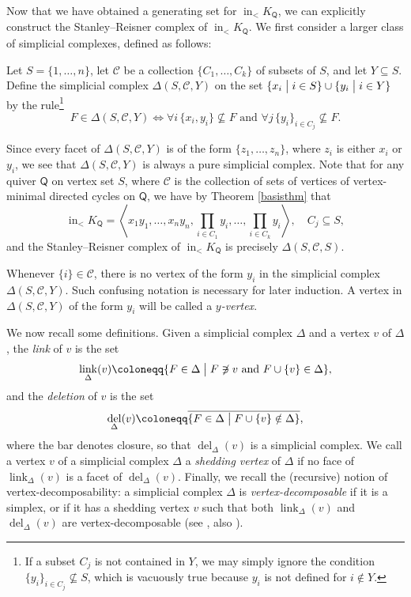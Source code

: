 \documentclass[ALCO,published]{cedram}
\numberwithin{equation}{section}
\newcommand{\st}{\bigm\vert}
\newcommand{\sC}{\mathscr{C}}
\DeclareMathOperator{\del}{\mathrm{del}}
\DeclareMathOperator{\In}{\mathrm{in}}
\DeclareMathOperator{\link}{\mathrm{link}}
\newcommand{\1}{^{-1}}
\newcommand{\la}{\langle}
\newcommand{\ra}{\rangle}
\def\Q{\mathsf{Q}}
\begin{document}
\noindent
Now that we have obtained a generating set for $\In_< K_{\Q}$, we can explicitly construct the Stanley--Reisner complex of $\In_< K_{\Q}$. We first consider a larger class of simplicial complexes, defined as follows:
\begin{defn}
Let $S = \{1,\dots,n\}$, let $\sC$ be a collection $\{C_1,\dots,C_k\}$ of subsets of $S$, and let $Y \subseteq S$.  Define the simplicial complex $\Delta(S,\sC,Y)$ on the set $\{x_i \st i \in S\} \cup \{y_i \st i \in Y\}$ by the rule\footnote{If a subset $C_j$ is not contained in $Y$, we may simply ignore the condition $\{y_i\}_{i\in C_j} \not\subseteq S$, which is vacuously true because $y_i$ is not defined for $i\not\in Y$.}
\[
F \in \Delta(S,\sC,Y) \iff \forall i \, \{x_i,y_i\} \not \subseteq F \text{ and } \forall j \, \{y_i\}_{i \in C_j} \not \subseteq F.
\]
\end{defn}
Since every facet of $\Delta(S,\sC,Y)$ is of the form $\{z_1,\dots,z_n\}$, where $z_i$ is either $x_i$ or $y_i$, we see that $\Delta(S,\sC,Y)$ is always a pure simplicial complex. Note that for any quiver $\Q$ on vertex set $S$, where $\sC$ is the collection of sets of vertices of vertex-minimal directed cycles on $\Q$, we have by Theorem \ref{basisthm} that
\begin{equation}\label{idealform}
\In_< K_{\mathsf Q} = \left \la x_1y_1,\dots,x_ny_n, \prod_{i \in C_1}y_i,\dots,\prod_{i \in C_k}y_i \right \ra, \quad C_j \subseteq S,
\end{equation}
and the Stanley--Reisner complex of $\In_< K_{\mathsf Q}$ is precisely $\Delta(S,\sC,S)$.  

\begin{rem}
Whenever $\{i\}\in \sC$, there is no vertex of the form $y_i$ in the simplicial complex $\Delta(S,\sC,Y)$.  Such confusing notation is necessary for later induction.  A vertex in $\Delta(S,\sC,Y)$ of the form $y_i$ will be called a \textit{$y$-vertex}.
\end{rem}

We now recall some definitions.
Given a simplicial complex $\Delta$ and a vertex $v$ of $\Delta$, the \textit{link} of $v$ is the set
\[\link_\Delta(v) \coloneqq \{F \in \Delta \st F \not\ni v \text{ and } F \cup \{v\} \in \Delta\},
\]
and the \textit{deletion} of $v$ is the set
\[
\del_{\Delta}(v) \coloneqq \overline{\{F \in \Delta \st F \cup \{v\} \notin \Delta\}},
\]
where the bar denotes closure, so that $\del_{\Delta}(v)$ is a simplicial complex. 
We call a vertex $v$ of a simplicial complex $\Delta$ a \textit{shedding vertex} of $\Delta$ if no face of $\link_\Delta(v)$ is a facet of $\del_\Delta(v)$. Finally, we recall the (recursive) notion of vertex-decomposability: a simplicial complex $\Delta$ is \textit{vertex-decomposable} if it is a simplex, or if it has a shedding vertex $v$ such that both $\link_\Delta(v)$ and $\del_\Delta(v)$ are vertex-decomposable (see \cite{BilleraProvan}, also \cite{BjornerWachs}). %
\end{document}
